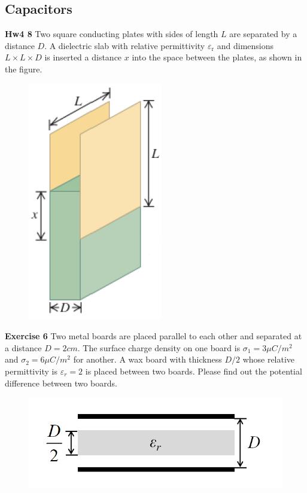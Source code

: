 \documentclass{beamer}
\begin{document}

\subsection{\bf Capacitors}

\begin{frame}{\bf Hw4 8}
    Two square conducting plates with sides of length $L$ are separated by a distance $D$. A dielectric slab with relative permittivity $\varepsilon_{\mathrm{r}}$ and dimensions $L \times L \times D$ is inserted a distance $x$ into the space between the plates, as shown in the figure.
    \begin{figure}
        \centering
        \includegraphics[scale=0.8]{images/HW4_8}
    \end{figure}
\end{frame}

\begin{frame}{\bf Exercise 6}
    Two metal boards are placed parallel to each other and 
    separated at a distance $D=2cm$. The surface charge density 
    on one board is $\sigma_{1}=3\mu C/m^2$ and $\sigma_{2}=6\mu C/m^2$ 
    for another. A wax board with thickness $D/2$ whose relative 
    permittivity is $\varepsilon_{r}=2$ is placed between two boards. 
    Please find out the potential difference between two boards.
\begin{figure}
    \centering
    \includegraphics[scale=0.6]{images/013.png}
\end{figure} 

\end{frame}
\end{document}
